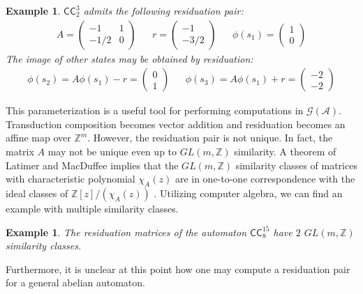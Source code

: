 \documentclass[12pt, letterpaper]{article}
\newcommand{\Z}{\mathbb Z}
\newcommand{\A}{\mathcal A}
\newcommand{\CC}{\mathsf{CC}}
\newcommand{\gp}{\mathcal G}
\newtheorem{example}[thm]{Example}
\begin{document}
\begin{example}
    $\CC^3_2$ admits the following residuation pair:
    \begin{align*}
        A = \begin{pmatrix}
            -1 & 1\\
            -1/2 & 0
        \end{pmatrix}
        &&
        r = \begin{pmatrix}-1\\-3/2\end{pmatrix}
        &&
        \phi(s_1) = \begin{pmatrix} 1\\0 \end{pmatrix}
    \end{align*}
    The image of other states may be obtained by residuation:
    \begin{align*}
        \phi(s_2) = A \phi(s_1) - r = \begin{pmatrix}
            0\\
            1
        \end{pmatrix}
        &&
        \phi(s_3) = A \phi(s_1) + r = \begin{pmatrix}
            -2\\
            -2
        \end{pmatrix}
    \end{align*}
\end{example}

This parameterization is a useful tool for performing computations in
$\gp(\A)$. Transduction composition becomes vector addition and residuation
becomes an affine map over $\Z^m$.  However, the residuation pair is not
unique. In fact, the matrix $A$ may not be unique even up to $GL(m, \Z)$
similarity.  A theorem of Latimer and MacDuffee implies that the $GL(m, \Z)$
similarity classes of matrices with characteristic polynomial $\chi_A(z)$ are
in one-to-one correspondence with the ideal classes of $\Z[z]/(\chi_A(z))$
\cite{latimer-macduffee}.  Utilizing computer algebra, we can find an example
with multiple similarity classes.
\begin{example}
    The residuation matrices of the automaton $\CC^{15}_8$ have $2$ $GL(m, \Z)$
    similarity classes.
\end{example}

Furthermore, it is unclear at this point how one may compute a residuation pair
for a general abelian automaton.
\end{document}
